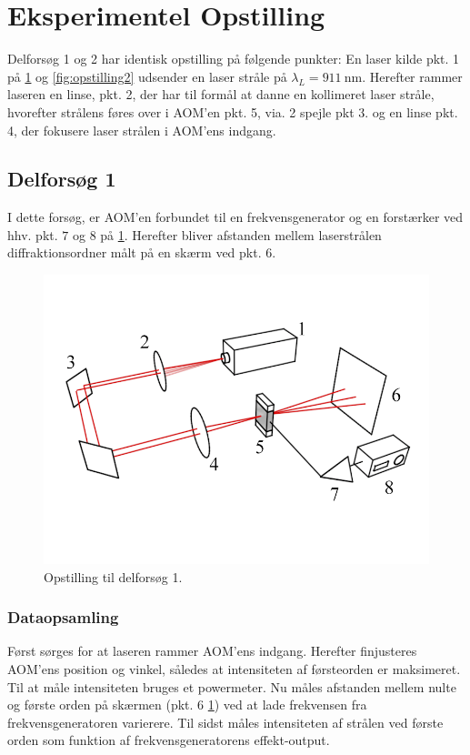 \documentclass[main]{subfiles}
\begin{document}
\section{Eksperimentel Opstilling}
Delforsøg 1 og 2 har identisk opstilling på følgende punkter: En laser kilde pkt. 1 på \cref{fig:opstilling1} og \cref{fig:opstilling2} udsender en laser stråle på $\lambda_L =  \SI{911}{\nano\m} $. Herefter rammer laseren en linse, pkt. 2, der har til formål at danne en kollimeret laser stråle, hvorefter strålens føres over i AOM'en pkt. 5, via. 2 spejle pkt 3. og en linse pkt. 4, der fokusere laser strålen i AOM'ens indgang.

\subsection{Delforsøg 1}
I dette forsøg, er AOM'en forbundet til en frekvensgenerator og en forstærker ved hhv. pkt. $7$ og $8$ på \cref{fig:opstilling1}. Herefter bliver afstanden mellem laserstrålen diffraktionsordner målt på en skærm ved pkt. $6$.
\begin{figure}[H]
    \includegraphics[width=\linewidth]{tegninger/tegning1.png}
    \caption{Opstilling til delforsøg 1.}
    \label{fig:opstilling1}
\end{figure}

\subsubsection{Dataopsamling}\label{dataopsamling1}
Først sørges for at laseren rammer AOM'ens indgang. Herefter finjusteres AOM'ens position og vinkel, således at intensiteten af førsteorden er maksimeret. Til at måle intensiteten bruges et powermeter. Nu måles afstanden mellem nulte og første orden på skærmen (pkt. 6 \cref{fig:opstilling1}) ved at lade frekvensen fra frekvensgeneratoren varierere.
Til sidst måles intensiteten af strålen ved første orden som funktion af frekvensgeneratorens effekt-output.
\end{document}
